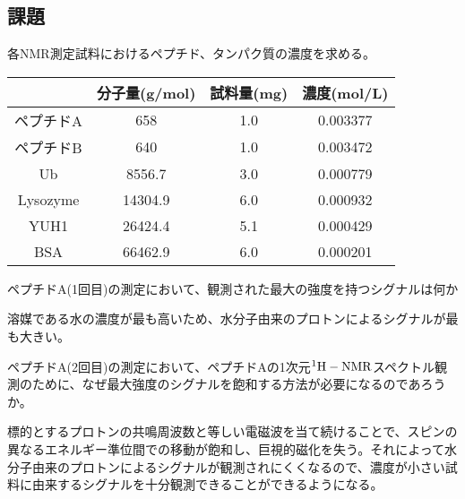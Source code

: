 \documentclass[a4paper,papersize,dvipdfmx]{jsarticle}
\begin{document}
\subsection*{課題}

\begin{tcolorbox}[colback=white,colbacktitle=black!10!white,coltitle=black,title={1}]
各NMR測定試料におけるペプチド、タンパク質の濃度を求める。
\end{tcolorbox}

\begin{table}[H]
\begin{center}
\begin{tabular}{|c|c|c|c|}
\hline
& 分子量(g/mol) & 試料量(mg) & 濃度(mol/L)        \\ \hline
ペプチドA      & 658     & 1.0       & 0.003377 \\ \hline
ペプチドB      & 640     & 1.0       & 0.003472 \\ \hline
Ub         & 8556.7  & 3.0       & 0.000779 \\ \hline
Lysozyme   & 14304.9 & 6.0       & 0.000932 \\ \hline
YUH1       & 26424.4 & 5.1       & 0.000429 \\ \hline
BSA        & 66462.9 & 6.0       & 0.000201 \\ \hline
\end{tabular}
\end{center}
\end{table}

\begin{tcolorbox}[colback=white,colbacktitle=black!10!white,coltitle=black,title={2}]
ペプチドA(1回目)の測定において、観測された最大の強度を持つシグナルは何か
\end{tcolorbox}

溶媒である水の濃度が最も高いため、水分子由来のプロトンによるシグナルが最も大きい。

\begin{tcolorbox}[colback=white,colbacktitle=black!10!white,coltitle=black,title={3}]
ペプチドA(2回目)の測定において、ペプチドAの1次元$\rm ^1H-NMR$スペクトル観測のために、なぜ最大強度のシグナルを飽和する方法が必要になるのであろうか。
\end{tcolorbox}

標的とするプロトンの共鳴周波数と等しい電磁波を当て続けることで、スピンの異なるエネルギー準位間での移動が飽和し、巨視的磁化を失う。それによって水分子由来のプロトンによるシグナルが観測されにくくなるので、濃度が小さい試料に由来するシグナルを十分観測できることができるようになる。
\end{document}

